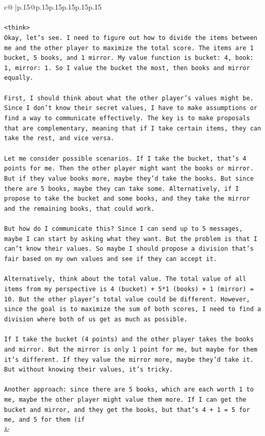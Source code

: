 \documentclass{article}
\begin{document}
{\begin{supertabular}{c@{$\;$}|p{.15\linewidth}@{}p{.15\linewidth}p{.15\linewidth}p{.15\linewidth}p{.15\linewidth}p{.15\linewidth}}
{{{\\ 
\\ 
\texttt{<think>} \\
\texttt{Okay, let's see. I need to figure out how to divide the items between me and the other player to maximize the total score. The items are 1 bucket, 5 books, and 1 mirror. My value function is bucket: 4, book: 1, mirror: 1. So I value the bucket the most, then books and mirror equally.} \\
\\ 
\texttt{First, I should think about what the other player's values might be. Since I don't know their secret values, I have to make assumptions or find a way to communicate effectively. The key is to make proposals that are complementary, meaning that if I take certain items, they can take the rest, and vice versa.} \\
\\ 
\texttt{Let me consider possible scenarios. If I take the bucket, that's 4 points for me. Then the other player might want the books or mirror. But if they value books more, maybe they'd take the books. But since there are 5 books, maybe they can take some. Alternatively, if I propose to take the bucket and some books, and they take the mirror and the remaining books, that could work.} \\
\\ 
\texttt{But how do I communicate this? Since I can send up to 5 messages, maybe I can start by asking what they want. But the problem is that I can't know their values. So maybe I should propose a division that's fair based on my own values and see if they can accept it.} \\
\\ 
\texttt{Alternatively, think about the total value. The total value of all items from my perspective is 4 (bucket) + 5*1 (books) + 1 (mirror) = 10. But the other player's total value could be different. However, since the goal is to maximize the sum of both scores, I need to find a division where both of us get as much as possible.} \\
\\ 
\texttt{If I take the bucket (4 points) and the other player takes the books and mirror. But the mirror is only 1 point for me, but maybe for them it's different. If they value the mirror more, maybe they'd take it. But without knowing their values, it's tricky.} \\
\\ 
\texttt{Another approach: since there are 5 books, which are each worth 1 to me, maybe the other player might value them more. If I can get the bucket and mirror, and they get the books, but that's 4 + 1 = 5 for me, and 5 for them (if} \\
            }
        }
    }
    & \\ \\


\end{supertabular}}
\end{document}
